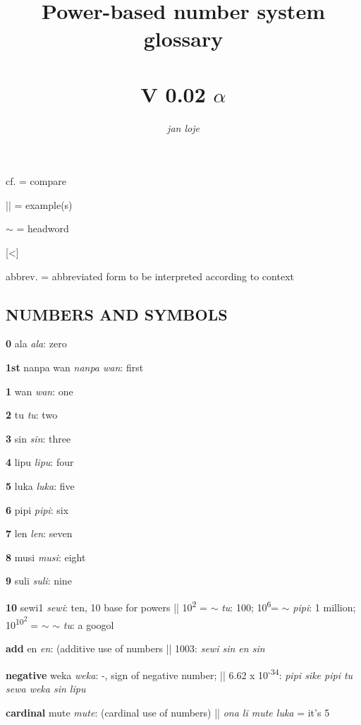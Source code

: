 \documentclass{article}
\title{Power-based number system glossary \\[1ex]{\HHUGE{\tpf lipu-nimi pi nasin nanpa sewi1}} \\ V 0.02 $\alpha$}
\author{\textit{jan loje}}
\begin{document}
\maketitle

\newcommand\tpDef[4]{\textbf{#1} {\Large\tpf #2} \textit{#3}: #4}


\newcommand\tpDefB[3]{\textbf{#1} {\Large\tpf #2}: \textit{#3}}

\setlength{\parskip}{0.3em}

cf. = compare

|| = example(s)

$\sim$ = headword

[<]

abbrev. = abbreviated form to be interpreted according to context


\begin{multicols}{2}
\raggedright
\begin{hangparas}{1cm}{1}

\section*{NUMBERS AND SYMBOLS}

\tpDef {0}{ala}{ala}{zero}

\tpDef {1st}{nanpa wan}{nanpa wan}{first}

\tpDef {1}{wan}{wan}{one}

\tpDef {2}{tu}{tu}{two}

\tpDef {3}{sin}{sin}{three}

\tpDef {4}{lipu}{lipu}{four}

\tpDef {5}{luka}{luka}{five}

\tpDef {6}{pipi}{pipi}{six}

\tpDef {7}{len}{len}{seven}

\tpDef {8}{musi}{musi}{eight}

\tpDef {9}{suli}{suli}{nine}

\tpDef {10}{sewi1}{sewi}{ten, 10 base for powers || 10\textsuperscript{2} = $\sim$ \textit{tu}: 100;  10\textsuperscript{6}= $\sim$ \textit{pipi}: 1 million; 10\textsuperscript{10\textsuperscript{2}} = $\sim$ $\sim$ \textit{tu}: a googol }

\tpDef {add}{en}{en}{(additive use of numbers || 1003:\textit{ sewi sin en sin}}

\tpDef {negative}{weka}{weka}{-, sign of negative number; ||  6.62 x 10\textsuperscript{-34}: \textit{pipi sike pipi tu sewa weka sin lipu} }

\tpDef {cardinal}{mute}{mute}{(cardinal use of numbers) || \textit{ona li mute luka} = it's 5}


\end{hangparas}
\end{multicols}
\end{document}

